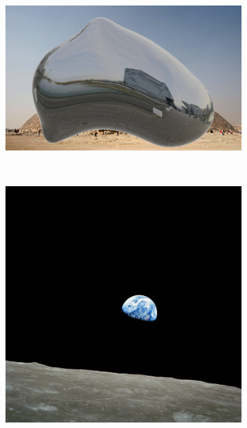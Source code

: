 \documentclass[%
reprint,
twocolumn,
nofootinbib,
 amsmath,amssymb,
 aps,
]{revtex4-2}
\begin{document}
\begin{figure}[H]
\begin{subfigure}{0.23\textwidth}
    \end{subfigure}
    \begin{subfigure}{0.23\textwidth}
        \includegraphics[width=0.98\linewidth]{img/pyramid-bean.jpg}
    \end{subfigure}
    \\
    \begin{subfigure}{0.23\textwidth}
        \includegraphics[width=0.98\linewidth]{img/earthrise.jpg}
    \end{subfigure}
    \begin{subfigure}{0.23\textwidth}

\end{subfigure}
\end{figure}
\end{document}
